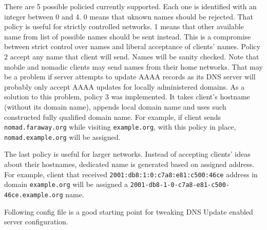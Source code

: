 There are 5 possible policied currently supported. Each one is
identified with an integer between 0 and 4. 0 means that uknown names
should be rejected. That policy is useful for strictly controlled
networks. 1 means that other available name from list of possible
names should be sent instead. This is a compromise between strict
control over names and liberal acceptance of clients' names. Policy 2
accept any name that client will send. Names will be sanity
checked. Note that mobile and nomadic clients may send names from
their home networks. That may be a problem if server attempts to
update AAAA records as its DNS server will probably only accept AAAA
updates for locally administered domains. As a solution to this
problem, policy 3 was implemented. It takes client's hostname (without
its domain name), appends local domain name and uses such constructed
fully qualified domain name. For example, if client
sends \verb+nomad.faraway.org+ while visiting \verb+example.org+, with
this policy in place, \verb+nomad.example.org+ will be assigned.

The last policy is useful for larger networks. Instead of accepting
clients' ideas about their hostnames, dedicated name is generated
based on assigned address. For example, client that received
\verb+2001:db8:1:0:c7a8:e81:c500:46ce+ address in domain 
\verb+example.org+ will be assigned 
a \verb+2001-db8-1-0-c7a8-e81-c500-46ce.example.org+ name.

Following config file is a good starting point for tweaking DNS
Update enabled server configuration.

